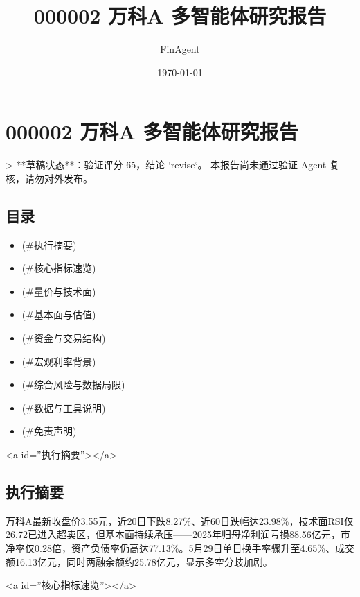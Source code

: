 \documentclass[12pt,a4paper]{article}
\title{000002 万科A 多智能体研究报告}
\author{FinAgent}
\date{\today}
\begin{document}
\maketitle
\tableofcontents
\newpage
\sloppy
\section{000002 万科A 多智能体研究报告}

> **草稿状态**：验证评分 65，结论 `revise`。 本报告尚未通过验证 Agent 复核，请勿对外发布。

\subsection{ 目录}

\begin{itemize}
\item [执行摘要](\#执行摘要)
\item [核心指标速览](\#核心指标速览)
\item [量价与技术面](\#量价与技术面)
\item [基本面与估值](\#基本面与估值)
\item [资金与交易结构](\#资金与交易结构)
\item [宏观利率背景](\#宏观利率背景)
\item [综合风险与数据局限](\#综合风险与数据局限)
\item [数据与工具说明](\#数据与工具说明)
\item [免责声明](\#免责声明)
\end{itemize}

<a id=''执行摘要''></a>

\subsection{ 执行摘要}
万科A最新收盘价3.55元，近20日下跌8.27\%、近60日跌幅达23.98\%，技术面RSI仅26.72已进入超卖区，但基本面持续承压——2025年归母净利润亏损88.56亿元，市净率仅0.28倍，资产负债率仍高达77.13\%。5月29日单日换手率骤升至4.65\%、成交额16.13亿元，同时两融余额约25.78亿元，显示多空分歧加剧。

<a id=''核心指标速览''></a>
\end{document}
